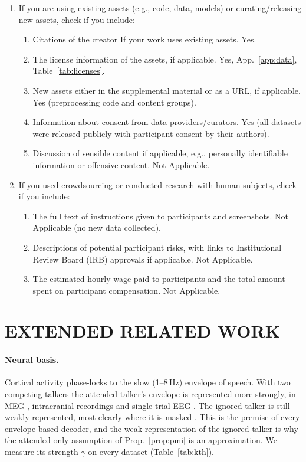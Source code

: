 \documentclass[twoside]{article}
\begin{document}
\begin{enumerate}
\begin{enumerate}
\end{enumerate}
\item If you are using existing assets (e.g., code, data, models) or curating/releasing new assets, check if you include:
\begin{enumerate}
\item Citations of the creator If your work uses existing assets. Yes.
\item The license information of the assets, if applicable. Yes, App.~\ref{app:data}, Table~\ref{tab:licenses}.
\item New assets either in the supplemental material or as a URL, if applicable. Yes (preprocessing code and content groups).
\item Information about consent from data providers/curators. Yes (all datasets were released publicly with participant consent by their authors).
\item Discussion of sensible content if applicable, e.g., personally identifiable information or offensive content. Not Applicable.
\end{enumerate}
\item If you used crowdsourcing or conducted research with human subjects, check if you include:
\begin{enumerate}
\item The full text of instructions given to participants and screenshots. Not Applicable (no new data collected).
\item Descriptions of potential participant risks, with links to Institutional Review Board (IRB) approvals if applicable. Not Applicable.
\item The estimated hourly wage paid to participants and the total amount spent on participant compensation. Not Applicable.
\end{enumerate}
\end{enumerate}
\clearpage
\appendix
\onecolumn
\section{EXTENDED RELATED WORK}\label{app:related}
\paragraph{Neural basis.} Cortical activity phase-locks to the slow (1--8\,Hz) envelope of
speech. With two competing talkers the attended talker's envelope is represented more
strongly, in MEG \citep{ding2012emergence}, intracranial recordings
\citep{mesgarani2012selective} and single-trial EEG \citep{osullivan2015attentional}. The
ignored talker is still weakly represented, most clearly where it is masked
\citep{brodbeck2020neural}. This is the premise of every envelope-based decoder, and the
weak representation of the ignored talker is why the attended-only assumption of
Prop.~\ref{prop:pmi} is an approximation. We measure its strength $\gamma$ on every
dataset (Table~\ref{tab:kth}).
\end{document}
